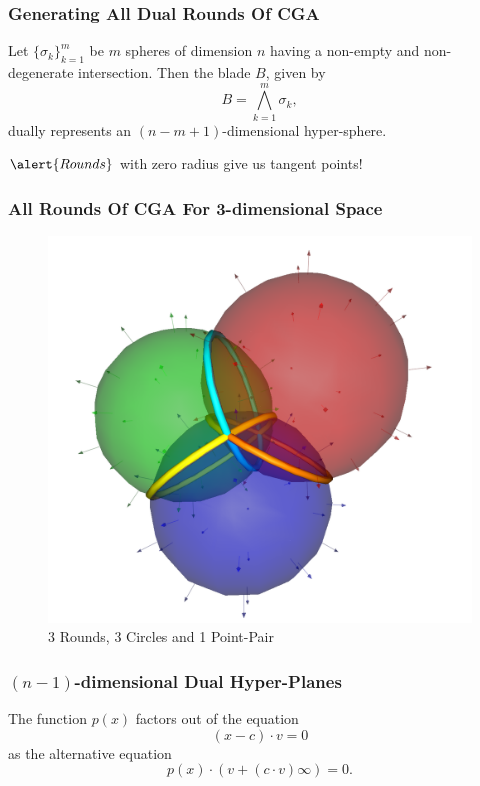 \documentclass{beamer}
\newcommand{\nvai}{\infty}
\begin{document}
\begin{frame}
\frametitle{Generating All \alert{Dual Rounds} Of CGA}
Let $\{\sigma_k\}_{k=1}^m$ be $m$ spheres of dimension $n$ having a \alert{non-empty} and
\alert{non-degenerate} intersection.
Then the blade $B$, given by
\begin{equation*}
B = \bigwedge_{k=1}^m\sigma_k,
\end{equation*}
\alert{dually} represents an $(n-m+1)$-dimensional hyper-sphere.

$\alert{Rounds}$ with zero radius give us \alert{tangent} points!
\end{frame}

\begin{frame}
\frametitle{All Rounds Of CGA For 3-dimensional Space}
\begin{figure}
\centering
\includegraphics[scale=0.2]{Rounds}
\caption{3 Rounds, 3 Circles and 1 Point-Pair}
\end{figure}
\end{frame}

\begin{frame}
\frametitle{$(n-1)$-dimensional \alert{Dual} Hyper-Planes}
The function $p(x)$ factors out of the equation
\begin{equation*}
(x-c)\cdot v = 0
\end{equation*}
as the alternative equation
\begin{equation*}
p(x)\cdot\left(v+(c\cdot v)\nvai\right) = 0.
\end{equation*}
\end{frame}
\end{document}
